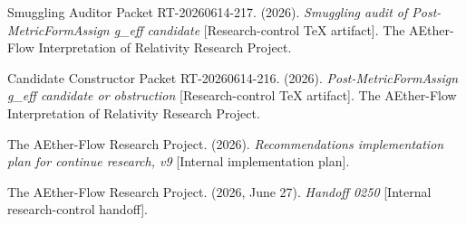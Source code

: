 \documentclass[11pt]{article}
\begin{document}
Smuggling Auditor Packet RT-20260614-217. (2026). \textit{Smuggling audit of
Post-MetricFormAssign g\_eff candidate} [Research-control TeX artifact]. The
AEther-Flow Interpretation of Relativity Research Project.

Candidate Constructor Packet RT-20260614-216. (2026). \textit{Post-MetricFormAssign
g\_eff candidate or obstruction} [Research-control TeX artifact]. The
AEther-Flow Interpretation of Relativity Research Project.

The AEther-Flow Research Project. (2026). \textit{Recommendations
implementation plan for continue research, v9} [Internal implementation plan].

The AEther-Flow Research Project. (2026, June 27). \textit{Handoff 0250}
[Internal research-control handoff].
\end{document}
